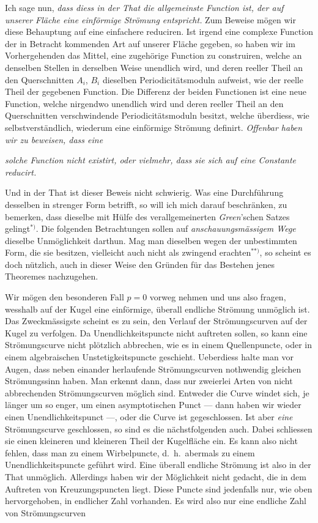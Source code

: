 \documentclass{article}
\begin{document}
Ich sage nun, \emph{dass diess in der That die allgemeinste Function ist, der auf unserer Fläche eine einförmige Strömung entspricht.} Zum Beweise mögen wir diese Behauptung auf eine einfachere reduciren. Ist irgend eine complexe Function der in Betracht kommenden Art auf unserer Fläche gegeben, so haben wir im Vorhergehenden das Mittel, eine zugehörige Function zu construiren, welche an denselben Stellen in derselben Weise unendlich wird, und deren reeller Theil an den Querschnitten $A_{i}$, $B_{i}$ dieselben Periodicitätsmoduln aufweist, wie der reelle Theil der gegebenen Function. Die Differenz der beiden Functionen ist eine neue Function, welche nirgendwo unendlich wird und deren reeller Theil an den Querschnitten verschwindende Periodicitätsmoduln besitzt, welche überdiess, wie selbstverständlich, wiederum eine einförmige Strömung definirt. \emph{Offenbar haben wir zu beweisen, dass eine}

\emph{solche Function nicht existirt, oder vielmehr, dass sie sich auf eine Constante reducirt.}

Und in der That ist dieser Beweis nicht schwierig. Was eine Durchführung desselben in strenger Form betrifft, so will ich mich darauf beschränken, zu bemerken, dass dieselbe mit Hülfe des verallgemeinerten \emph{Green}'schen Satzes gelingt${}^{*)}$. Die folgenden Betrachtungen sollen auf \emph{anschauungsmässigem Wege} dieselbe Unmöglichkeit darthun. Mag man dieselben wegen der unbestimmten Form, die sie besitzen, vielleicht auch nicht als zwingend erachten${}^{**)}$, so scheint es doch nützlich, auch in dieser Weise den Gründen für das Bestehen jenes Theoremes nachzugehen.

Wir mögen den besonderen Fall $p = 0$ vorweg nehmen und uns also fragen, wesshalb auf der Kugel eine einförmige, überall endliche Strömung unmöglich ist. Das Zweckmässigste scheint es zu sein, den Verlauf der Strömungscurven auf der Kugel zu verfolgen. Da Unendlichkeitspuncte nicht auftreten sollen, so kann eine Strömungscurve nicht plötzlich abbrechen, wie es in einem Quellenpuncte, oder in einem algebraischen Unstetigkeitspuncte geschieht. Ueberdiess halte man vor Augen, dass neben einander herlaufende Strömungscurven nothwendig gleichen Strömungssinn haben. Man erkennt dann, dass nur zweierlei Arten von nicht abbrechenden Strömungscurven möglich sind. Entweder die Curve windet sich, je länger um so enger, um einen asymptotischen Punct --- dann haben wir wieder einen Unendlichkeitspunct ---, oder die Curve ist gegeschlossen. Ist aber \emph{eine} Strömungscurve geschlossen, so sind es die nächstfolgenden auch. Dabei schliessen sie einen kleineren und kleineren Theil der Kugelfläche ein. Es kann also nicht fehlen, dass man zu einem Wirbelpuncte, d.\ h.\ abermals zu einem Unendlichkeitspuncte geführt wird. Eine überall endliche Strömung ist also in der That unmöglich. Allerdings haben wir der Möglichkeit nicht gedacht, die in dem Auftreten von Kreuzungspuncten liegt. Diese Puncte sind jedenfalls nur, wie oben hervorgehoben, in endlicher Zahl vorhanden. Es wird also nur eine endliche Zahl von Strömungscurven
\end{document}
